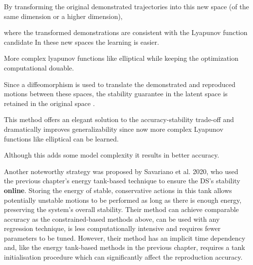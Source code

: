 


By transforming the original demonstrated trajectories into this new space (of the same dimension or a higher dimension),

where the transformed demonstrations are
consistent with the Lyapunov function candidate
In these new spaces the learning is easier.

More complex lyapunov functions like elliptical while keeping the optimization computational douable.

Since a diffeomorphism is used to translate the demonstrated and reproduced motions between these spaces, the stability guarantee in the latent space is retained in the original space \cite{leeIntroductionTopologicalManifolds2011,leeIntroductionSmoothManifolds2012,leeIntroductionRiemannianManifolds2018}.

This method offers an elegant solution to the accuracy-stability trade-off and dramatically improves generalizability since now more complex Lyapunov functions like elliptical can be learned.

Although this adds some model complexity it results in better accuracy.


Another noteworthy strategy was proposed by Savariano et al. 2020\cite{saverianoEnergybasedApproachEnsure2020}, who used the previous chapter's energy tank-based technique to ensure the DS's stability \textbf{online}. Storing the energy of stable, conservative actions in this tank allows potentially unstable motions to be performed as long as there is enough energy, preserving the system's overall stability. Their method can achieve comparable accuracy as the constrained-based methods above, can be used with any regression technique, is less computationally intensive and requires fewer parameters to be tuned. However, their method has an implicit time dependency and, like the energy tank-based methods in the previous chapter, requires a tank initialisation procedure which can significantly affect the reproduction accuracy.

